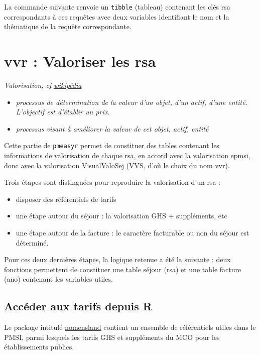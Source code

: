 \documentclass[]{book}
\providecommand{\tightlist}{%
  \setlength{\itemsep}{0pt}\setlength{\parskip}{0pt}}
\begin{document}
La commande suivante renvoie un \texttt{tibble} (tableau) contenant les
clés rsa correspondants à ces requêtes avec deux variables identifiant
le nom et la thématique de la requête correspondante.

\chapter{vvr : Valoriser les rsa}\label{vvr-valoriser-les-rsa}

\emph{Valorisation, cf
\href{https://fr.wikipedia.org/wiki/Valorisation}{wikipédia}}

\begin{itemize}
\tightlist
\item
  \emph{processus de détermination de la valeur d'un objet, d'un actif,
  d'une entité. L'objectif est d'établir un prix.}
\item
  \emph{processus visant à améliorer la valeur de cet objet, actif,
  entité}
\end{itemize}

Cette partie de \texttt{pmeasyr} permet de constituer des tables
contenant les informations de valorisation de chaque rsa, en accord avec
la valorisation epmsi, donc avec la valorisation VisualValoSej (VVS,
d'où le choix du nom vvr).

Trois étapes sont distinguées pour reproduire la valorisation d'un rsa :

\begin{itemize}
\tightlist
\item
  disposer des référentiels de tarifs
\item
  une étape autour du séjour : la valorisation GHS + suppléments, etc
\item
  une étape autour de la facture : le caractère facturable ou non du
  séjour est déterminé.
\end{itemize}

Pour ces deux dernières étapes, la logique retenue a été la suivante :
deux fonctions permettent de constituer une table séjour (rsa) et une
table facture (ano) contenant les variables utiles.

\section{Accéder aux tarifs depuis R}\label{acceder-aux-tarifs-depuis-r}

Le package intitulé
\href{https://guillaumepressiat.github.io/nomensland/index.html}{nomensland}
contient un ensemble de référentiels utiles dans le PMSI, parmi lesquels
les tarifs GHS et suppléments du MCO pour les établissements publics.
\end{document}
